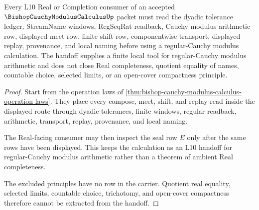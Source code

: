 \begin{theorem}
\label{thm:bishop-cauchy-modulus-calculus-l10-handoff}
Every L10 Real or Completion consumer of an accepted $\BishopCauchyModulusCalculusUp$ packet must read the dyadic tolerance ledger, StreamName windows, RegSeqRat readback, Cauchy modulus arithmetic row, displayed meet row, finite shift row, componentwise transport, displayed replay, provenance, and local naming before using a regular-Cauchy modulus calculation. The handoff supplies a finite local tool for regular-Cauchy modulus arithmetic and does not close Real completeness, quotient equality of names, countable choice, selected limits, or an open-cover compactness principle.
\end{theorem}
\begin{proof}
Start from the operation laws of \autoref{thm:bishop-cauchy-modulus-calculus-operation-laws}. They place every compose, meet, shift, and replay read inside the displayed route through dyadic tolerances, finite windows, regular readback, arithmetic, transport, replay, provenance, and local naming.

The Real-facing consumer may then inspect the seal row $E$ only after the same rows have been displayed. This keeps the calculation as an L10 handoff for regular-Cauchy modulus arithmetic rather than a theorem of ambient Real completeness.

The excluded principles have no row in the carrier. Quotient real equality, selected limits, countable choice, trichotomy, and open-cover compactness therefore cannot be extracted from the handoff.
\end{proof}




